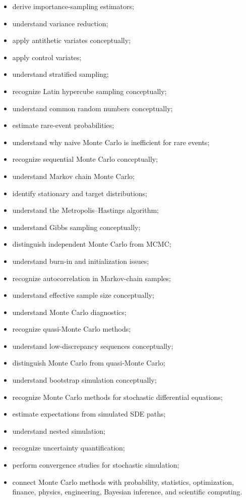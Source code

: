 {\begin{itemize}
    \item derive importance-sampling estimators;
    \item understand variance reduction;
    \item apply antithetic variates conceptually;
    \item apply control variates;
    \item understand stratified sampling;
    \item recognize Latin hypercube sampling conceptually;
    \item understand common random numbers conceptually;
    \item estimate rare-event probabilities;
    \item understand why naive Monte Carlo is inefficient for rare events;
    \item recognize sequential Monte Carlo conceptually;
    \item understand Markov chain Monte Carlo;
    \item identify stationary and target distributions;
    \item understand the Metropolis--Hastings algorithm;
    \item understand Gibbs sampling conceptually;
    \item distinguish independent Monte Carlo from MCMC;
    \item understand burn-in and initialization issues;
    \item recognize autocorrelation in Markov-chain samples;
    \item understand effective sample size conceptually;
    \item understand Monte Carlo diagnostics;
    \item recognize quasi-Monte Carlo methods;
    \item understand low-discrepancy sequences conceptually;
    \item distinguish Monte Carlo from quasi-Monte Carlo;
    \item understand bootstrap simulation conceptually;
    \item recognize Monte Carlo methods for stochastic differential
          equations;
    \item estimate expectations from simulated SDE paths;
    \item understand nested simulation;
    \item recognize uncertainty quantification;
    \item perform convergence studies for stochastic simulation;
    \item connect Monte Carlo methods with probability, statistics,
          optimization, finance, physics, engineering, Bayesian inference,
          and scientific computing.
\end{itemize}
}

